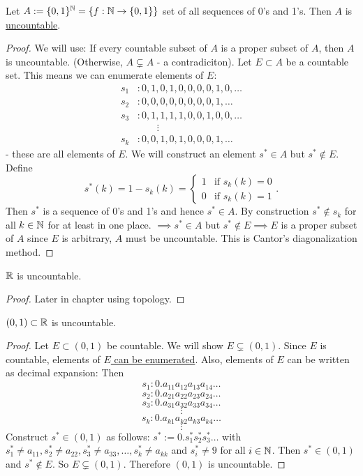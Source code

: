 \documentclass[]{article}
\begin{document}
\begin{theorem}
	Let $A:=\{0,1\}^{\mathbb{N}} = \{f:\mathbb{N}\rightarrow\{0,1\}\}$ set of all sequences of 0's and 1's.
	Then $A$ is \ul{uncountable}.
\end{theorem}
\begin{proof}
	We will use: If every countable subset of $A$ is a proper subset of $A$, then $A$ is uncountable.
	(Otherwise, $A\subsetneq A$ - a contradiciton).
	Let $E\subset A$ be a countable set. This means we can enumerate elements of $E$:
	\begin{align*}
		s_1&: 0,1,0,1,0,0,0,0,1,0,\dots \\
		s_2&: 0,0,0,0,0,0,0,0,1,\dots \\
		s_3&: 0,1,1,1,1,0,0,1,0,0,\dots \\
			&\qquad\vdots \\
		s_k&: 0,0,1,0,1,0,0,0,1,\dots
	\end{align*}
	- these are all elements of $E$.
	We will construct an element $s^*\in A$ but $s^*\notin E$.
	Define $$s^*(k) = 1-s_k(k) = \begin{cases} 1 & \text{if } s_k(k) = 0 \\ 0 & \text{if } s_k(k) = 1 \end{cases}.$$
	Then $s^*$ is a sequence of 0's and 1's and hence $s^*\in A$.
	By construction $s^*\notin s_k$ for all $k\in\mathbb{N}$ for at least in one place. $\implies s^*\in A$ but $s^*\notin E \implies E$ is a proper subset of $A$ since $E$ is arbitrary, $A$ must be uncountable. This is Cantor's diagonalization method.
\end{proof}
\begin{corollary}
	$\mathbb{R}$ is uncountable.
\end{corollary}
\begin{proof}
	Later in chapter using topology.
\end{proof}

\begin{theorem}
	$(0,1)\subset \mathbb{R}$ is uncountable.
\end{theorem}
\begin{proof}
	Let $E\subset (0,1)$ be countable. We will show $E\subsetneq (0,1)$.
	Since $E$ is countable, elements of \ul{$E$ can be enumerated}. Also, elements of $E$ can be written as decimal expansion: Then
	$$s_1: 0.a_{11}a_{12}a_{13}a_{14}\dots$$
	$$s_2: 0.a_{21}a_{22}a_{23}a_{24}\dots$$
	$$s_3: 0.a_{31}a_{32}a_{33}a_{34}\dots$$
	$$ \vdots$$
	$$s_k: 0.a_{k1}a_{k2}a_{k3}a_{k4}\dots$$
	$$ \vdots $$
	Construct $s^*\in(0,1)$ as follows: $s^* := 0.s_1^*s_2^*s_3^*\dots$ with $s_1^*\neq a_{11}, s_2^*\neq a_{22}, s_3^*\neq a_{33}, \dots, s_k^* \neq a_{kk}$ and $s_i^*\neq 9$ for all $i\in\mathbb{N}$.
	Then $s^*\in(0,1)$ and $s^*\notin E$. So $E\subsetneq (0,1)$. Therefore $(0,1)$ is uncountable.
\end{proof}
\end{document}
